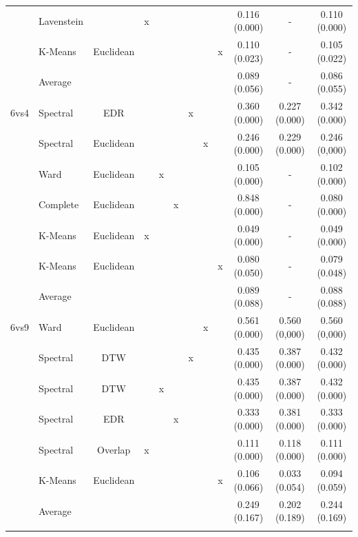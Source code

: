 \documentclass[12pt,a4paper,bibliography=totocnumbered,listof=totocnumbered]{scrartcl}
\begin{document}
{\begin{appendix}
\begin{table}[!htbp]
\begin{tabular}{@{\extracolsep{0pt}} llcccccccccc}
		& Lavenstein &  & x &  &  &  &  &  & 0.116 (0.000) & - & 0.110 (0.000) \\ 
		& K-Means & Euclidean &  &  &  &  &  & x & 0.110 (0.023) & - & 0.105 (0.022) \\ 
		& Average &  &  &  &  &  &  &  & 0.089 (0.056) & - & 0.086 (0.055) \\ 
		6vs4 & Spectral & EDR &  &  &  & x &  &  & 0.360 (0.000) & 0.227 (0.000) & 0.342 (0.000) \\ 
		& Spectral & Euclidean  &  &  &  &  & x &  & 0.246 (0.000) & 0.229 (0.000) & 0.246 (0,000) \\ 
		& Ward & Euclidean  &  & x &  &  &  &  & 0.105 (0.000) & - & 0.102 (0.000) \\ 
		& Complete & Euclidean  &  &  & x &  &  &  & 0.848 (0.000) & - & 0.080 (0.000) \\ 
		& K-Means & Euclidean  & x &  &  &  &  &  & 0.049 (0.000) & - & 0.049 (0.000) \\ 
		& K-Means & Euclidean  &  &  &  &  &  & x & 0.080 (0.050) & - & 0.079 (0.048) \\ 
		& Average &  &  &  &  &  &  &  & 0.089 (0.088) & - & 0.088 (0.088) \\ 
		6vs9 & Ward  & Euclidean &  &  &  &  & x &  & 0.561 (0.000) & 0.560 (0,000) & 0.560 (0,000) \\ 
		& Spectral & DTW &  &  &  & x &  &  & 0.435 (0.000) & 0.387 (0.000) & 0.432 (0.000) \\ 
		& Spectral & DTW &  & x &  &  &  &  & 0.435 (0.000) & 0.387 (0.000) & 0.432 (0.000) \\ 
		& Spectral & EDR &  &  & x &  &  &  & 0.333 (0.000) & 0.381 (0.000) & 0.333 (0.000) \\ 
		& Spectral & Overlap & x &  &  &  &  &  & 0.111 (0.000) & 0.118 (0.000) & 0.111 (0.000) \\ 
		& K-Means & Euclidean &  &  &  &  &  & x & 0.106 (0.066) & 0.033 (0.054) & 0.094 (0.059) \\ 
		& Average &  &  &  &  &  &  &  & 0.249 (0.167) & 0.202 (0.189) & 0.244 (0.169) \\ 
		\hline \\[-1.8ex] 
	\end{tabular} 
	\label{tab:prison1}
\end{table} 


\end{appendix}}
\end{document}
